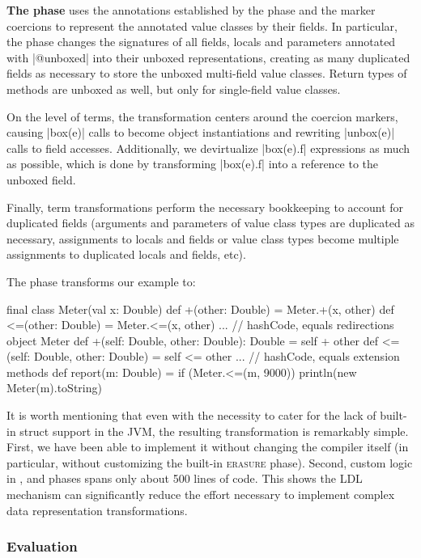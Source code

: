 \textbf{The \commit{} phase} uses the annotations established by the \inject{} phase and the marker coercions to represent the annotated value classes by their fields. In particular, the \commit{} phase changes the signatures of all fields, locals and parameters annotated with |@unboxed| into their unboxed representations, creating as many duplicated fields as necessary to store the unboxed multi-field value classes. Return types of methods are unboxed as well, but only for single-field value classes.

On the level of terms, the transformation centers around the coercion markers, causing |box(e)| calls to become object instantiations and rewriting |unbox(e)| calls to field accesses. Additionally, we devirtualize |box(e).f| expressions as much as possible, which is done by transforming |box(e).f| into a reference to the unboxed field.

Finally, term transformations perform the necessary bookkeeping to account for duplicated fields (arguments and parameters of value class types are duplicated as necessary, assignments to locals and fields or value class types become multiple assignments to duplicated locals and fields, etc).

The \commit{} phase transforms our example to:

\begin{lstlisting-nobreak}
 final class Meter(val x: Double) {
   def +(other: Double) = Meter.+(x, other)
   def <=(other: Double) = Meter.<=(x, other)
   ... // hashCode, equals redirections
 }
 object Meter {
   def +(self: Double, other: Double): Double = self + other
   def <=(self: Double, other: Double) = self <= other
   ... // hashCode, equals extension methods
 }
 def report(m: Double) = {
   if (Meter.<=(m, 9000))
     println(new Meter(m).toString)
 }
\end{lstlisting-nobreak}

It is worth mentioning that even with the necessity to cater for the lack of built-in struct support in the JVM, the resulting transformation is remarkably simple. First, we have been able to implement it without changing the compiler itself (in particular, without customizing the built-in \textsc{erasure} phase). Second, custom logic in \inject{}, \coerce{} and \commit{} phases spans only about 500 lines of code. This shows the LDL mechanism can significantly reduce the effort necessary to implement complex data representation transformations.

\subsubsection*{Evaluation}

